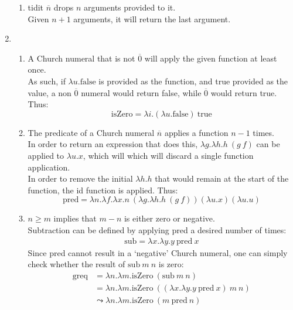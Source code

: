 \documentclass[11pt,a4paper,twoside]{article}
\newcommand{\true}{\mathrm{true}}
\newcommand{\false}{\mathrm{false}}
\newcommand{\pred}{\mathrm{pred}}
\newcommand{\numeral}[1]{\overline{#1}}
\begin{document}
\begin{enumerate}
\begin{enumerate}
    \item %
      tidit $\numeral{n}$ drops $n$ arguments provided to it. \\
      Given $n+1$ arguments, it will return the last argument.
  \end{enumerate}

  \item %
  \begin{enumerate}
    \item %
      A Church numeral that is not $\numeral{0}$ will apply the given function at
      least once.\\
      As such, if  $\lambda u.\false$  is provided as the function, and true
      provided as the value, a non $\numeral{0}$ numeral would return false, while
      $\numeral{0}$ would return true.\\
      Thus:\\
      \begin{equation*}
        \mathrm{isZero} = \lambda i. (\lambda u.\false)\ \true
      \end{equation*}

    \item %
      The predicate of a Church numeral $\numeral{n}$ applies a function
      $n-1$ times.\\
      In order to return an expression that does this,  $\lambda g.\lambda h.h\ (g\ f)$
      can be applied to $\lambda u.x$, which will which will discard a single
      function application.\\
      In order to remove the initial $\lambda h.h$ that would remain at the start
      of the function, the id function is applied.
      Thus:\\
      \begin{equation*}
        \pred = \lambda n.\lambda f. \lambda x. n\ (\lambda g.\lambda h.h\ (g\ f)) (\lambda u.x) (\lambda u.u)
      \end{equation*}

    \item %
      $n \geq m$ implies that $m-n$ is either zero or negative.\\
      Subtraction can be defined by applying pred a desired number of times:
      \begin{align*}
        \mathrm{sub} = \lambda x.\lambda y.y\ \pred\ x
      \end{align*}
      Since pred cannot result in a `negative' Church numeral, one can simply
      check whether the result of $\mathrm{sub}\ m\ n$ is zero:
      \begin{align*}
        \mathrm{greq}
          &= \lambda n.\lambda m.\mathrm{isZero}\ (\mathrm{sub}\ m\ n) \\
          &= \lambda n.\lambda m.\mathrm{isZero}\ ((\lambda x.\lambda y.y\ \pred\ x)\ m\ n) \\
          &\leadsto \lambda n.\lambda m.\mathrm{isZero}\ (m\ \pred\ n) \\
      \end{align*}

  \end{enumerate}
\end{enumerate}
\end{document}
